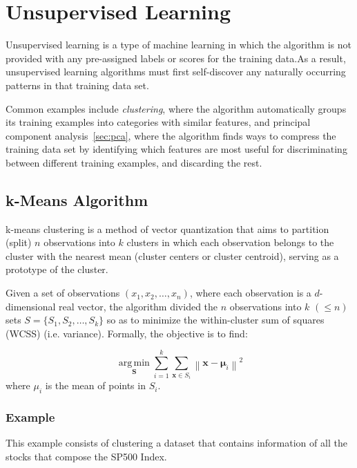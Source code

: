 \section{Unsupervised Learning}
    
Unsupervised learning is a type of machine learning in which the algorithm is not provided with any pre-assigned labels or scores for the training data.As a result, unsupervised learning algorithms must first self-discover any naturally occurring patterns in that training data set. 
    
Common examples include \emph{clustering}, where the algorithm automatically groups its training examples into categories with similar features, and principal component analysis~\ref{sec:pca}, where the algorithm finds ways to compress the training data set by identifying which features are most useful for discriminating between different training examples, and discarding the rest. 
    
\subsection{k-Means Algorithm}
    
k-means clustering is a method of vector quantization that aims to partition (split) $n$ observations into $k$ clusters in which each observation belongs to the cluster with the nearest mean (cluster centers or cluster centroid), serving as a prototype of the cluster. 
    
Given a set of observations $(x_1, x_2, \ldots, x_n)$, where each observation is a $d$-dimensional real vector, the algorithm divided the $n$ observations into $k$ $(\leq n)$ sets $S = \{S_1, S_2, \ldots, S_k\}$ so as to minimize the within-cluster sum of squares (WCSS) (i.e. variance). Formally, the objective is to find:
    
\begin{equation}
\underset {\mathbf {S}}{\operatorname {arg\,min} } \sum _{i=1}^{k}\sum _{\mathbf {x} \in S_{i}}\left\|\mathbf {x} -{\boldsymbol {\mu }}_{i}\right\|^{2}
\end{equation}
where $μ_i$ is the mean of points in $S_i$. 
    
\subsubsection{Example}
This example consists of clustering a dataset that contains information of all the stocks that compose the SP500 Index. 
    
